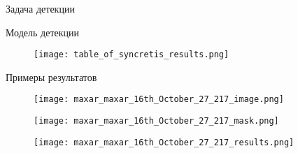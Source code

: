 \documentclass{beamer}
\begin{document}
\begin{section}{Задача детекции}
\begin{frame}{Модель детекции}
\begin{figure}[H]
	\centering
	\texttt{[image: table\_of\_syncretis\_results.png]}
\end{figure}

\end{frame}

\begin{frame}{Примеры результатов}
\begin{figure}[H]
	\centering
	\texttt{[image: maxar\_maxar\_16th\_October\_27\_217\_image.png]}
\end{figure}

\begin{figure}
	\centering
	\begin{minipage}{0.5\textwidth}
		\texttt{[image: maxar\_maxar\_16th\_October\_27\_217\_mask.png]}
	\end{minipage}%
	\begin{minipage}{0.5\textwidth}
		\texttt{[image: maxar\_maxar\_16th\_October\_27\_217\_results.png]}
	\end{minipage}
\end{figure}

\end{frame}

\end{section}
\end{document}
